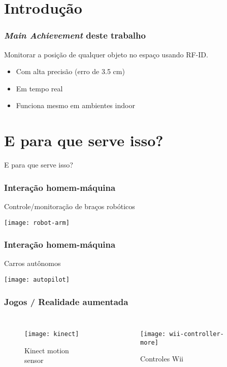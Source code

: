 \section{Introdução}


\begin{frame}
  \frametitle{\emph{Main Achievement} deste trabalho}

    Monitorar a posição de qualquer objeto no espaço usando RF-ID.

    \begin{itemize}
      \item Com \alert{alta precisão} (erro de 3.5 cm)
      \item Em \alert{tempo real}
      \item Funciona mesmo em ambientes \alert{indoor}
    \end{itemize}
\end{frame}

\section{E para que serve isso?}

\begin{frame}
  \begin{center}
    \Huge E para que serve isso?
  \end{center}
\end{frame}

\begin{frame}
  \frametitle{Interação homem-máquina}
  Controle/monitoração de braços robóticos

  \begin{center}
    \texttt{[image: robot-arm]}
  \end{center}
\end{frame}

\begin{frame}
  \frametitle{Interação homem-máquina}
  Carros autônomos

  \begin{center}
    \texttt{[image: autopilot]}
  \end{center}
\end{frame}

\begin{frame}
  \frametitle{Jogos / Realidade aumentada}
    \begin{columns}[T,onlytextwidth]
					\begin{figure}
							\texttt{[image: kinect]}
						\captionsetup{labelformat=empty}
						\caption{Kinect motion sensor}
					\end{figure}

					\begin{figure}
							\texttt{[image: wii-controller-more]}
						\captionsetup{labelformat=empty}
						\caption{Controles Wii}
					\end{figure}
    \end{columns}
\end{frame}

